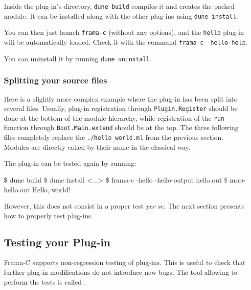 Inside the plug-in's directory, \texttt{dune build} compiles it and creates the
packed module. It can be installed along with the other \framac plug-ins using
\verb|dune install|.

You can then just launch \texttt{frama-c} (without any options), and the
\texttt{hello} plug-in will be automatically loaded. Check it with the command
\verb|frama-c -hello-help|.

You can uninstall it by running \verb|dune uninstall|.

\subsubsection*{Splitting your source files}

Here is a slightly more complex example where the plug-in has been split into
several files. Usually, plug-in registration through \texttt{Plugin.Register}
should be done at the bottom of the module hierarchy, while registration of the
\texttt{run} function through \texttt{Boot.Main.extend} should be at the top.
The three following files completely replace the \texttt{./hello\_world.ml}
from the previous section. Modules are directly called by their name in the
classical \ocaml way.




The plug-in can be tested again by running:

\begin{shell}
\$ dune build
\$ dune install
<...>
\$ frama-c -hello -hello-output hello.out
\$ more hello.out
Hello, world!
\end{shell}

However, this does not consist in a proper test \emph{per se}. The next section
presents how to properly test plug-ins.

\subsection{Testing your Plug-in}\label{tut2:testing}

Frama-C supports non-regression testing of plug-ins. This is useful to check
that further plug-in modifications do not introduce new bugs. The tool allowing
to perform the tests is called \ptests{}.

